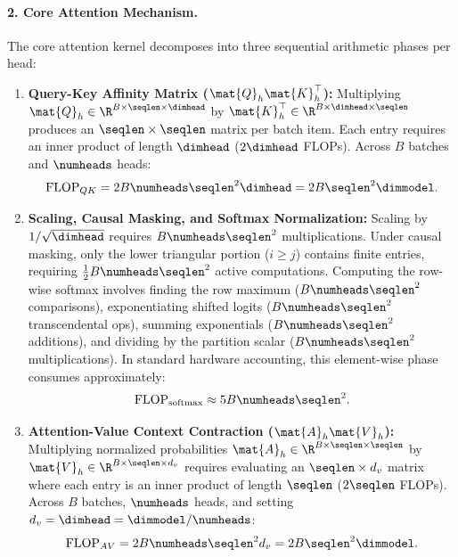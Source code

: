\paragraph{2. Core Attention Mechanism.}
The core attention kernel decomposes into three sequential arithmetic phases per head:
\begin{enumerate}
\item \textbf{Query-Key Affinity Matrix ($\mat{Q}_h \mat{K}_h^\top$):} 
Multiplying $\mat{Q}_h \in \R^{B \times \seqlen \times \dimhead}$ by $\mat{K}_h^\top \in \R^{B \times \dimhead \times \seqlen}$ produces an $\seqlen \times \seqlen$ matrix per batch item. Each entry requires an inner product of length $\dimhead$ ($2\dimhead$ FLOPs). Across $B$ batches and $\numheads$ heads:
\begin{equation}
\operatorname{FLOP}_{QK} = 2 B \numheads \seqlen^2 \dimhead = 2 B \seqlen^2 \dimmodel.
\end{equation}
\item \textbf{Scaling, Causal Masking, and Softmax Normalization:} 
Scaling by $1/\sqrt{\dimhead}$ requires $B \numheads \seqlen^2$ multiplications. Under causal masking, only the lower triangular portion ($i \ge j$) contains finite entries, requiring $\frac{1}{2} B \numheads \seqlen^2$ active computations. Computing the row-wise softmax involves finding the row maximum ($B \numheads \seqlen^2$ comparisons), exponentiating shifted logits ($B \numheads \seqlen^2$ transcendental ops), summing exponentials ($B \numheads \seqlen^2$ additions), and dividing by the partition scalar ($B \numheads \seqlen^2$ multiplications). In standard hardware accounting, this element-wise phase consumes approximately:
\begin{equation}
\operatorname{FLOP}_{\text{softmax}} \approx 5 B \numheads \seqlen^2.
\end{equation}
\item \textbf{Attention-Value Context Contraction ($\mat{A}_h \mat{V}_h$):} 
Multiplying normalized probabilities $\mat{A}_h \in \R^{B \times \seqlen \times \seqlen}$ by $\mat{V}_h \in \R^{B \times \seqlen \times d_v}$ requires evaluating an $\seqlen \times d_v$ matrix where each entry is an inner product of length $\seqlen$ ($2\seqlen$ FLOPs). Across $B$ batches, $\numheads$ heads, and setting $d_v = \dimhead = \dimmodel / \numheads$:
\begin{equation}
\operatorname{FLOP}_{AV} = 2 B \numheads \seqlen^2 d_v = 2 B \seqlen^2 \dimmodel.
\end{equation}
\end{enumerate}
